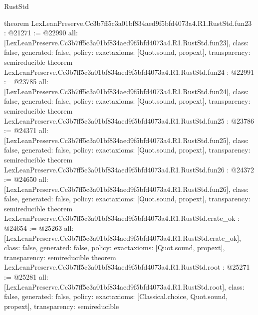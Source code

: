 \begin{lexlean}{RustStd}
\begin{coremodule}
{}
theorem LexLeanPreserve.Cc3b7ff5c3a01bf834aed9f5bfd4073a4.R1.RustStd.fun23 : @21271 := @22990 {
  all: [LexLeanPreserve.Cc3b7ff5c3a01bf834aed9f5bfd4073a4.R1.RustStd.fun23],
  class: false,
  generated: false,
  policy: exact{axioms: [Quot.sound, propext]},
  transparency: semireducible
}
theorem LexLeanPreserve.Cc3b7ff5c3a01bf834aed9f5bfd4073a4.R1.RustStd.fun24 : @22991 := @23785 {
  all: [LexLeanPreserve.Cc3b7ff5c3a01bf834aed9f5bfd4073a4.R1.RustStd.fun24],
  class: false,
  generated: false,
  policy: exact{axioms: [Quot.sound, propext]},
  transparency: semireducible
}
theorem LexLeanPreserve.Cc3b7ff5c3a01bf834aed9f5bfd4073a4.R1.RustStd.fun25 : @23786 := @24371 {
  all: [LexLeanPreserve.Cc3b7ff5c3a01bf834aed9f5bfd4073a4.R1.RustStd.fun25],
  class: false,
  generated: false,
  policy: exact{axioms: [Quot.sound, propext]},
  transparency: semireducible
}
theorem LexLeanPreserve.Cc3b7ff5c3a01bf834aed9f5bfd4073a4.R1.RustStd.fun26 : @24372 := @24650 {
  all: [LexLeanPreserve.Cc3b7ff5c3a01bf834aed9f5bfd4073a4.R1.RustStd.fun26],
  class: false,
  generated: false,
  policy: exact{axioms: [Quot.sound, propext]},
  transparency: semireducible
}
theorem LexLeanPreserve.Cc3b7ff5c3a01bf834aed9f5bfd4073a4.R1.RustStd.crate_ok : @24654 := @25263 {
  all: [LexLeanPreserve.Cc3b7ff5c3a01bf834aed9f5bfd4073a4.R1.RustStd.crate_ok],
  class: false,
  generated: false,
  policy: exact{axioms: [Quot.sound, propext]},
  transparency: semireducible
}
theorem LexLeanPreserve.Cc3b7ff5c3a01bf834aed9f5bfd4073a4.R1.RustStd.root : @25271 := @25281 {
  all: [LexLeanPreserve.Cc3b7ff5c3a01bf834aed9f5bfd4073a4.R1.RustStd.root],
  class: false,
  generated: false,
  policy: exact{axioms: [Classical.choice, Quot.sound, propext]},
  transparency: semireducible
}


\end{coremodule}
\end{lexlean}
